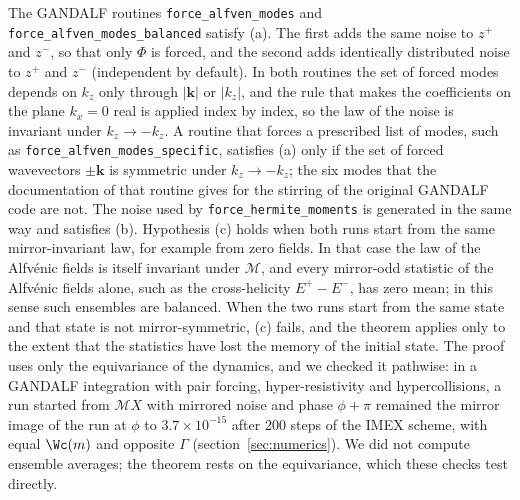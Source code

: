 The GANDALF routines \texttt{force\_alfven\_\allowbreak modes} and \texttt{force\_alfven\_modes\_\allowbreak balanced} satisfy (a). The first adds the same noise to $z^+$ and $z^-$, so that only $\Phi$ is forced, and the second adds identically distributed noise to $z^+$ and $z^-$ (independent by default). In both routines the set of forced modes depends on $k_z$ only through $|\boldsymbol k|$ or $|k_z|$, and the rule that makes the coefficients on the plane $k_x=0$ real is applied index by index, so the law of the noise is invariant under $k_z\to-k_z$. A routine that forces a prescribed list of modes, such as \texttt{force\_alfven\_modes\_\allowbreak specific}, satisfies (a) only if the set of forced wavevectors $\pm\boldsymbol k$ is symmetric under $k_z\to-k_z$; the six modes that the documentation of that routine gives for the stirring of the original GANDALF code are not. The noise used by \texttt{force\_hermite\_\allowbreak moments} is generated in the same way and satisfies (b). Hypothesis (c) holds when both runs start from the same mirror-invariant law, for example from zero fields. In that case the law of the Alfv\'enic fields is itself invariant under $\mathcal M$, and every mirror-odd statistic of the Alfv\'enic fields alone, such as the cross-helicity $E^+-E^-$, has zero mean; in this sense such ensembles are balanced. When the two runs start from the same state and that state is not mirror-symmetric, (c) fails, and the theorem applies only to the extent that the statistics have lost the memory of the initial state. The proof uses only the equivariance of the dynamics, and we checked it pathwise: in a GANDALF integration with pair forcing, hyper-resistivity and hypercollisions, a run started from $\mathcal MX$ with mirrored noise and phase $\phi+\pi$ remained the mirror image of the run at $\phi$ to $3.7\times10^{-15}$ after 200 steps of the IMEX scheme, with equal $\Wc(m)$ and opposite $\Gamma$ (section~\ref{sec:numerics}). We did not compute ensemble averages; the theorem rests on the equivariance, which these checks test directly.


